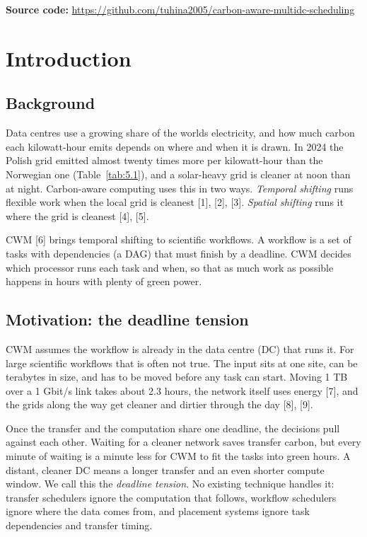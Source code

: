 \documentclass[12pt,a4paper,oneside,openany]{report}
\begin{document}
\textbf{Source code:}
\url{https://github.com/tuhina2005/carbon-aware-multidc-scheduling}

\clearpage
{}
\setcounter{page}{1}

\chapter{Introduction}\label{ch:1}

\section{Background}\label{sec:1.1}

Data centres use a growing share of the world\textquotesingle s
electricity, and how much carbon each kilowatt-hour emits depends on
where and when it is drawn. In 2024 the Polish grid emitted almost
twenty times more per kilowatt-hour than the Norwegian one (Table~\ref{tab:5.1}),
and a solar-heavy grid is cleaner at noon than at night. Carbon-aware
computing uses this in two ways. \emph{Temporal shifting} runs flexible
work when the local grid is cleanest {[}1{]}, {[}2{]}, {[}3{]}.
\emph{Spatial shifting} runs it where the grid is cleanest {[}4{]},
{[}5{]}.

CWM {[}6{]} brings temporal shifting to scientific workflows. A workflow
is a set of tasks with dependencies (a DAG) that must finish by a
deadline. CWM decides which processor runs each task and when, so that
as much work as possible happens in hours with plenty of green power.

\section{Motivation: the deadline tension}\label{sec:1.2}

CWM assumes the workflow is already in the data centre (DC) that runs
it. For large scientific workflows that is often not true. The input
sits at one site, can be terabytes in size, and has to be moved before
any task can start. Moving 1 TB over a 1 Gbit/s link takes about 2.3
hours, the network itself uses energy {[}7{]}, and the grids along the
way get cleaner and dirtier through the day {[}8{]}, {[}9{]}.

Once the transfer and the computation share one deadline, the decisions
pull against each other. Waiting for a cleaner network saves transfer
carbon, but every minute of waiting is a minute less for CWM to fit the
tasks into green hours. A distant, cleaner DC means a longer transfer
and an even shorter compute window. We call this the \emph{deadline
tension}. No existing technique handles it: transfer schedulers ignore
the computation that follows, workflow schedulers ignore where the data
comes from, and placement systems ignore task dependencies and transfer
timing.
\end{document}
